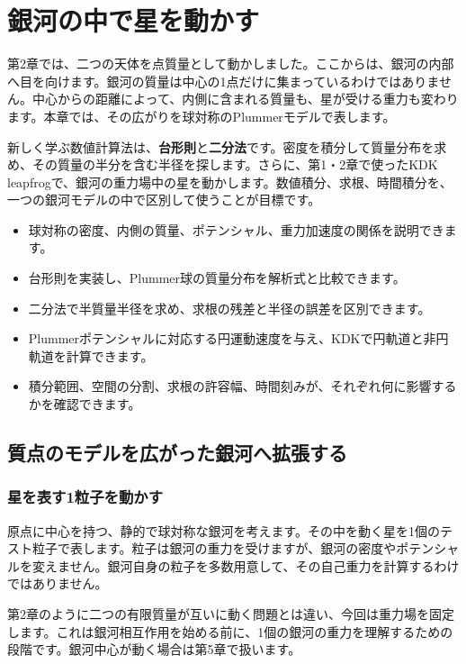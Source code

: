 \chapter{銀河の中で星を動かす}
\label{chap:plummer}

第2章では、二つの天体を点質量として動かしました。ここからは、銀河の内部へ目を向けます。銀河の質量は中心の1点だけに集まっているわけではありません。中心からの距離によって、内側に含まれる質量も、星が受ける重力も変わります。本章では、その広がりを球対称のPlummerモデルで表します。

新しく学ぶ数値計算法は、\textbf{台形則}と\textbf{二分法}です。密度を積分して質量分布を求め、その質量の半分を含む半径を探します。さらに、第1・2章で使ったKDK leapfrogで、銀河の重力場中の星を動かします。数値積分、求根、時間積分を、一つの銀河モデルの中で区別して使うことが目標です。

\begin{goalbox}[この章で学ぶこと]
\begin{itemize}
\item 球対称の密度、内側の質量、ポテンシャル、重力加速度の関係を説明できます。
\item 台形則を実装し、Plummer球の質量分布を解析式と比較できます。
\item 二分法で半質量半径を求め、求根の残差と半径の誤差を区別できます。
\item Plummerポテンシャルに対応する円運動速度を与え、KDKで円軌道と非円軌道を計算できます。
\item 積分範囲、空間の分割、求根の許容幅、時間刻みが、それぞれ何に影響するかを確認できます。
\end{itemize}
\end{goalbox}

\section{質点のモデルを広がった銀河へ拡張する}
\label{sec:ch3-model}
\subsection{星を表す1粒子を動かす}
原点に中心を持つ、静的で球対称な銀河を考えます。その中を動く星を1個のテスト粒子で表します。粒子は銀河の重力を受けますが、銀河の密度やポテンシャルを変えません。銀河自身の粒子を多数用意して、その自己重力を計算するわけではありません。

第2章のように二つの有限質量が互いに動く問題とは違い、今回は重力場を固定します。これは銀河相互作用を始める前に、1個の銀河の重力を理解するための段階です。銀河中心が動く場合は第5章で扱います。

